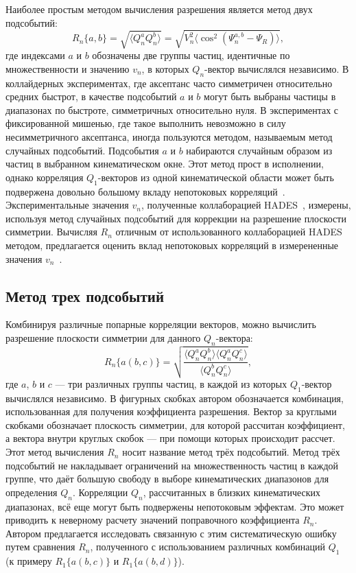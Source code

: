 Наиболее простым методом вычисления разрешения является метод двух подсобытий:
%
\begin{equation}
    R_n\{a,b\} = \sqrt{ \langle Q_n^a Q_n^b \rangle } = \sqrt{ V_n^2 \langle \cos^{2}( \Psi^{a,b}_n - \Psi_R ) \rangle },
    \label{eq:r1_2sub}
\end{equation}
где индексами $a$ и $b$ обозначены две группы частиц, идентичные по множественности и значению $v_n$, в которых $Q_n$-вектор вычислялся независимо.
В коллайдерных экспериментах, где аксептанс часто симметричен относительно средних быстрот, в качестве подсобытий $a$ и $b$ могут быть выбраны частицы в диапазонах по быстроте, симметричных относительно нуля.
В экспериментах с фиксированной мишенью, где такое выполнить невозможно в силу несимметричного аксептанса, иногда пользуются методом, называемым метод случайных подсобытий.
Подсобытия $a$ и $b$ набираются случайным образом из частиц в выбранном кинематическом окне.
Этот метод прост в исполнении, однако корреляция $Q_1$-векторов из одной кинематической области может быть подвержена довольно большому вкладу непотоковых корреляций~\cite{Mamaev:2020lpi}.
Экспериментальные значения $v_n$, полученные коллаборацией HADES~\cite{HADES:2020lob}, измерены, используя метод случайных подсобытий для коррекции на разрешение плоскости симметрии. 
Вычисляя $R_n$ отличным от использованного коллаборацией HADES методом, предлагается оценить вклад непотоковых корреляций в измерененные значения $v_n$~\cite{Mamaev:2020lpi, Mamaev:2020qom}.

\subsection{Метод трех подсобытий}

Комбинируя различные попарные корреляции векторов, можно вычислить разрешение плоскости симметрии для данного $Q_n$-вектора:
%
\begin{equation}
    R_n\{a(b,c)\}  =  \sqrt { \frac{ \langle Q_n^a Q_n^b \rangle \langle Q_n^a Q_n^c \rangle }{ \langle Q_n^b Q_n^c \rangle} },
    \label{eq:r1_3sub}
\end{equation}
%
где $a$, $b$ и $c$ --- три различных группы частиц, в каждой из которых $Q_1$-вектор вычислялся независимо.
В фигурных скобках автором обозначается комбинация, использованная для получения коэффициента разрешения.
Вектор за круглыми скобками обозначает плоскость симметрии, для которой рассчитан коэффициент, а вектора внутри круглых скобок --- при помощи которых происходит рассчет.
Этот метод вычисления $R_n$ носит название метод трёх подсобытий.
Метод трёх подсобытий не накладывает ограничений на множественность частиц в каждой группе, что даёт большую свободу в выборе кинематических диапазонов для определения $Q_n$.
Корреляции $Q_n$, рассчитанных в близких кинематических диапазонах, всё еще могут быть подвержены непотоковым эффектам.
Это может приводить к неверному расчету значений поправочного коэффициента $R_n$.
Автором предлагается исследовать связанную с этим систематическую ошибку путем сравнения $R_n$, полученного с использованием различных комбинаций $Q_1$ (к примеру $R_1\{a(b,c)\}$ и $R_1\{a(b,d)\}$).

